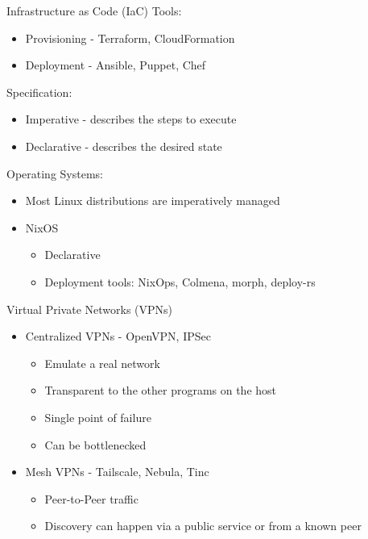 \begin{frame}{Infrastructure as Code (IaC)}
\protect\hypertarget{infrastructure-as-code-iac}{}
Tools:

\begin{itemize}
\tightlist
\item
  Provisioning - Terraform, CloudFormation
\item
  Deployment - Ansible, Puppet, Chef
\end{itemize}

Specification:

\begin{itemize}
\tightlist
\item
  Imperative - describes the steps to execute
\item
  Declarative - describes the desired state
\end{itemize}

Operating Systems:

\begin{itemize}
\tightlist
\item
  Most Linux distributions are imperatively managed
\item
  NixOS

  \begin{itemize}
  \tightlist
  \item
    Declarative
  \item
    Deployment tools: NixOps, Colmena, morph, deploy-rs
  \end{itemize}
\end{itemize}
\end{frame}

\begin{frame}{Virtual Private Networks (VPNs)}
\protect\hypertarget{virtual-private-networks-vpns}{}
\begin{itemize}
\tightlist
\item
  Centralized VPNs - OpenVPN, IPSec

  \begin{itemize}
  \tightlist
  \item
    Emulate a real network
  \item
    Transparent to the other programs on the host
  \item
    Single point of failure
  \item
    Can be bottlenecked
  \end{itemize}
\item
  Mesh VPNs - Tailscale, Nebula, Tinc

  \begin{itemize}
  \tightlist
  \item
    Peer-to-Peer traffic
  \item
    Discovery can happen via a public service or from a known peer
  \end{itemize}
\end{itemize}
\end{frame}

